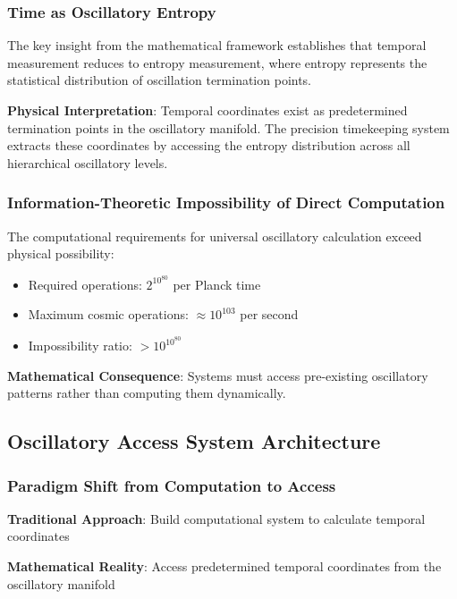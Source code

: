 \documentclass[12pt,a4paper]{article}
\begin{document}
{\subsubsection{Time as Oscillatory Entropy}

The key insight from the mathematical framework establishes that temporal measurement reduces to entropy measurement, where entropy represents the statistical distribution of oscillation termination points.

\textbf{Physical Interpretation}: Temporal coordinates exist as predetermined termination points in the oscillatory manifold. The precision timekeeping system extracts these coordinates by accessing the entropy distribution across all hierarchical oscillatory levels.

\subsubsection{Information-Theoretic Impossibility of Direct Computation}

The computational requirements for universal oscillatory calculation exceed physical possibility:

\begin{itemize}
\item Required operations: $2^{10^{80}}$ per Planck time
\item Maximum cosmic operations: $\approx 10^{103}$ per second
\item Impossibility ratio: $> 10^{10^{80}}$
\end{itemize}

\textbf{Mathematical Consequence}: Systems must access pre-existing oscillatory patterns rather than computing them dynamically.

\subsection{Oscillatory Access System Architecture}

\subsubsection{Paradigm Shift from Computation to Access}

\textbf{Traditional Approach}: Build computational system to calculate temporal coordinates

\textbf{Mathematical Reality}: Access predetermined temporal coordinates from the oscillatory manifold

}
\end{document}
